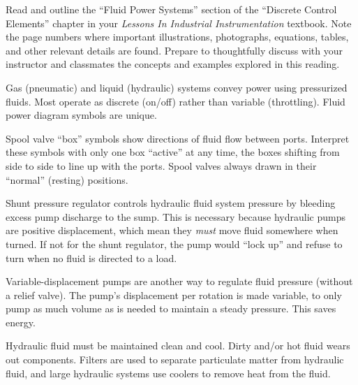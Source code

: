 

Read and outline the ``Fluid Power Systems'' section of the ``Discrete Control Elements'' chapter in your {\it Lessons In Industrial Instrumentation} textbook.  Note the page numbers where important illustrations, photographs, equations, tables, and other relevant details are found.  Prepare to thoughtfully discuss with your instructor and classmates the concepts and examples explored in this reading.














Gas (pneumatic) and liquid (hydraulic) systems convey power using pressurized fluids.  Most operate as discrete (on/off) rather than variable (throttling).  Fluid power diagram symbols are unique.

\vskip 10pt

Spool valve ``box'' symbols show directions of fluid flow between ports.  Interpret these symbols with only one box ``active'' at any time, the boxes shifting from side to side to line up with the ports.  Spool valves always drawn in their ``normal'' (resting) positions.

\vskip 10pt

Shunt pressure regulator controls hydraulic fluid system pressure by bleeding excess pump discharge to the sump.  This is necessary because hydraulic pumps are positive displacement, which mean they {\it must} move fluid somewhere when turned.  If not for the shunt regulator, the pump would ``lock up'' and refuse to turn when no fluid is directed to a load.

\vskip 10pt

Variable-displacement pumps are another way to regulate fluid pressure (without a relief valve).  The pump's displacement per rotation is made variable, to only pump as much volume as is needed to maintain a steady pressure.  This saves energy.

\vskip 10pt

Hydraulic fluid must be maintained clean and cool.  Dirty and/or hot fluid wears out components.  Filters are used to separate particulate matter from hydraulic fluid, and large hydraulic systems use coolers to remove heat from the fluid.

